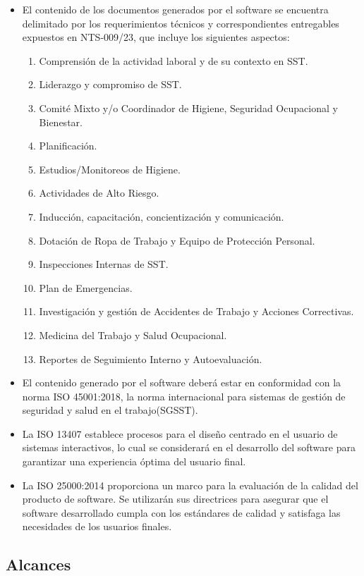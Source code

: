 \begin{itemize}
	\item El contenido de los documentos generados por el software se encuentra delimitado por los requerimientos técnicos y correspondientes entregables expuestos en NTS-009/23, que incluye los siguientes aspectos:
	\begin{enumerate}
		\item Comprensión de la actividad laboral y de su contexto en SST.
		\item Liderazgo y compromiso de SST.
		\item Comité Mixto y/o Coordinador de Higiene, Seguridad Ocupacional y Bienestar.
		\item Planificación.
		\item Estudios/Monitoreos de Higiene.
		\item Actividades de Alto Riesgo.
		\item Inducción, capacitación, concientización y comunicación.
		\item Dotación de Ropa de Trabajo y Equipo de Protección Personal.
		\item Inspecciones Internas de SST.
		\item Plan de Emergencias.
		\item Investigación y gestión de Accidentes de Trabajo y Acciones Correctivas.
		\item Medicina del Trabajo y Salud Ocupacional.
		\item Reportes de Seguimiento Interno y Autoevaluación.
	\end{enumerate}
	\item El contenido generado por el software deberá estar en conformidad con la norma ISO 45001:2018, la norma internacional para sistemas de gestión de seguridad y salud en el trabajo(SGSST).
	\item La ISO 13407 establece procesos para el diseño centrado en el usuario de sistemas interactivos, lo cual se considerará en el desarrollo del software para garantizar una experiencia óptima del usuario final.
	\item La ISO 25000:2014 proporciona un marco para la evaluación de la calidad del producto de software. Se utilizarán sus directrices para asegurar que el software desarrollado cumpla con los estándares de calidad y satisfaga las necesidades de los usuarios finales.
\end{itemize}

\subsection{Alcances}

